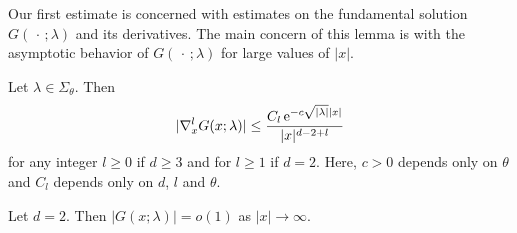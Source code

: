 Our first estimate is concerned with estimates on the fundamental solution $G(\,\cdot\,;\lambda)$ and its derivatives.
The main concern of this lemma is with the asymptotic behavior of $G(\,\cdot\,; \lambda)$ for large values of $|x|$.

\begin{lem}
  \label{lem:estimateHelmholtzDerivatives}
  Let $\lambda \in \Sigma_\theta$.
  Then
  \begin{align}
    \label{eq:estimateHelmholtzDerivatives}
    |\nabla_x^l G(x; \lambda)| \leq \frac{ C_l \, \mathrm{e}^{-c \sqrt{|\lambda|} |x|}}{|x|^{d - 2 + l}}
  \end{align}
  for any integer $l \geq 0$ if $d \geq 3$ and for $l \geq 1$ if $d = 2$.
  Here, $c > 0$ depends only on $\theta$ and $C_l$ depends only on $d$, $l$ and $\theta$.

  Let $d = 2$. Then $|G(x; \lambda)| = o(1)$ as $|x| \to \infty$.
\end{lem}

